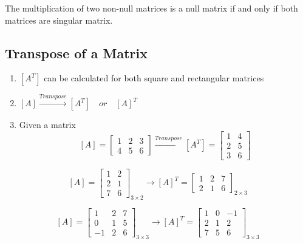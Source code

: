 \begin{enumerate}
    \begin{notebox}{}
        The multiplication of two non-null matrices is a null matrix if and only if both matrices are singular matrix.
    \end{notebox}
\end{enumerate}

\subsection{Transpose of a Matrix}

\begin{enumerate}
    \item $[A^T]$ can be calculated for both square and rectangular matrices

    \item $[A] \xrightarrow{Transpose} [A^T] \quad or \quad [A]^T$

    \item Given a matrix $$[A] = \begin{bmatrix}
        1 & 2 & 3 \\
        4 & 5 & 6
    \end{bmatrix} \xrightarrow{Transpose}
    [A^T] = \begin{bmatrix}
        1 & 4 \\
        2 & 5 \\
        3 & 6
    \end{bmatrix}
    $$
\end{enumerate}

$$  [A] = \begin{bmatrix}
    1 & 2 \\
    2 & 1 \\
    7 & 6
    \end{bmatrix}_{3 \times 2} \longrightarrow [A]^T = \begin{bmatrix}
    1 & 2 & 7 \\
    2 & 1 & 6
    \end{bmatrix}_{2 \times 3}
$$

$$  [A] = \begin{bmatrix}
    1 & 2 & 7 \\
    0 & 1 & 5 \\
    -1 & 2 & 6
    \end{bmatrix}_{3 \times 3} \longrightarrow [A]^T = \begin{bmatrix}
    1 & 0 & -1 \\
    2 & 1 & 2 \\
    7 & 5 & 6
    \end{bmatrix}_{3 \times 3}
$$

